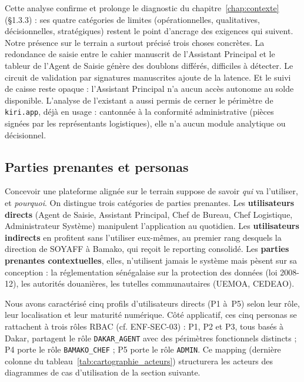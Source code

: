 Cette analyse confirme et prolonge le diagnostic du chapitre~\ref{chap:contexte} (\S1.3.3) : ses quatre catégories de limites (opérationnelles, qualitatives, décisionnelles, stratégiques) restent le point d'ancrage des exigences qui suivent. Notre présence sur le terrain a surtout précisé trois choses concrètes. La redondance de saisie entre le cahier manuscrit de l'Assistant Principal et le tableur de l'Agent de Saisie génère des doublons différés, difficiles à détecter. Le circuit de validation par signatures manuscrites ajoute de la latence. Et le suivi de caisse reste opaque : l'Assistant Principal n'a aucun accès autonome au solde disponible. L'analyse de l'existant a aussi permis de cerner le périmètre de \texttt{kiri.app}, déjà en usage : cantonnée à la conformité administrative (pièces signées par les représentants logistiques), elle n'a aucun module analytique ou décisionnel.

\subsection{Parties prenantes et personas}
\label{sec:personas}
Concevoir une plateforme alignée sur le terrain suppose de savoir \emph{qui} va l'utiliser, et \emph{pourquoi}. On distingue trois catégories de parties prenantes. Les \textbf{utilisateurs directs} (Agent de Saisie, Assistant Principal, Chef de Bureau, Chef Logistique, Administrateur Système) manipulent l'application au quotidien. Les \textbf{utilisateurs indirects} en profitent sans l'utiliser eux-mêmes, au premier rang desquels la direction de SOYAFF à Bamako, qui reçoit le reporting consolidé. Les \textbf{parties prenantes contextuelles}, elles, n'utilisent jamais le système mais pèsent sur sa conception : la réglementation sénégalaise sur la protection des données (loi 2008-12), les autorités douanières, les tutelles communautaires (UEMOA, CEDEAO).

Nous avons caractérisé cinq profils d'utilisateurs directs (P1 à~P5) selon leur rôle, leur localisation et leur maturité numérique. Côté applicatif, ces cinq personas se rattachent à trois rôles RBAC (cf. ENF-SEC-03) : P1, P2 et P3, tous basés à Dakar, partagent le rôle \texttt{DAKAR\_AGENT} avec des périmètres fonctionnels distincts ; P4 porte le rôle \texttt{BAMAKO\_CHEF} ; P5 porte le rôle \texttt{ADMIN}. Ce mapping (dernière colonne du tableau~\ref{tab:cartographie_acteurs}) structurera les acteurs des diagrammes de cas d'utilisation de la section suivante.

